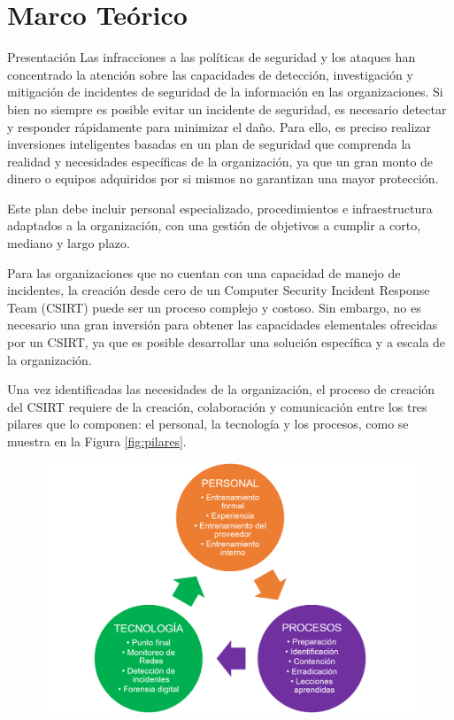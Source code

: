 \chapter{Marco Teórico}
    \begin{section}{Presentación}
        Las infracciones a las políticas de seguridad y los ataques han concentrado la atención sobre las capacidades de detección, investigación y mitigación de incidentes de seguridad de la información en  las organizaciones. Si bien no siempre es posible evitar un incidente de seguridad, es necesario detectar y responder rápidamente para minimizar el daño. Para ello, es preciso realizar inversiones inteligentes basadas en un plan de seguridad que comprenda la realidad y necesidades específicas de la organización, ya que un gran monto de dinero o equipos adquiridos por si mismos no garantizan una mayor protección. \par
        Este plan debe incluir personal especializado, procedimientos e infraestructura  adaptados a la organización, con una gestión de objetivos a cumplir a corto, mediano y largo plazo. \par
        Para las organizaciones que no cuentan con una capacidad de manejo de incidentes, la creación desde cero de un Computer Security Incident Response Team (CSIRT) puede ser un proceso complejo y costoso. Sin embargo, no es necesario una gran inversión para obtener las capacidades elementales ofrecidas por un CSIRT, ya que es posible desarrollar una solución específica y a escala de la organización. \par
        Una vez identificadas las necesidades de la organización, el proceso de creación del CSIRT requiere de la creación, colaboración y comunicación entre los tres pilares que lo componen: el personal, la tecnología y los procesos, como se muestra en la Figura \ref{fig:pilares}. \par
        \begin{figure}[H]
            \centering
            \includegraphics[width=1\textwidth]{./marco_teorico_imagenes/figura_1_pilares.png}

\end{figure}
\end{section}
